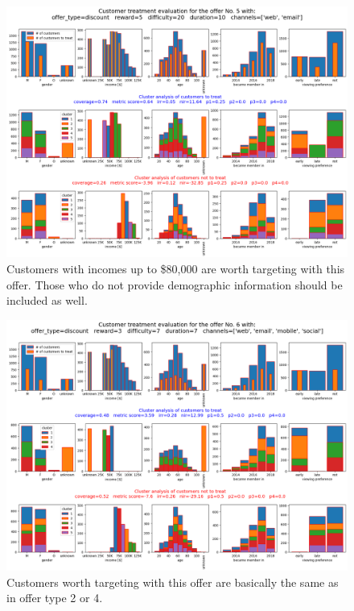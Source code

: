 \documentclass[11pt]{article} %
\begin{document}
\begin{figure}[H]
\includegraphics[height=0.5\textheight]{results/results5.png}
\caption{Customers with  incomes up to \$80,000 are worth targeting with this offer. Those who do not provide demographic information should be included as well.}
\end{figure}
\begin{figure}[H]
\includegraphics[height=0.5\textheight]{results/results6.png}
\caption{Customers worth targeting with this offer are basically the same as in offer type 2 or 4.}
\end{figure}
\end{document}
